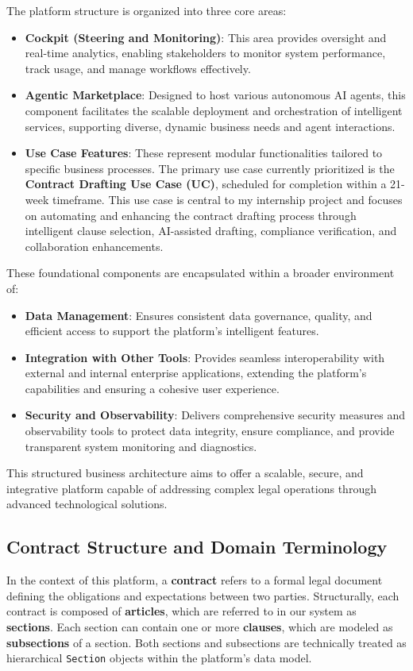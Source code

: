 The platform structure is organized into three core areas:

\begin{itemize}
\item \textbf{Cockpit (Steering and Monitoring)}: This area provides oversight and real-time analytics, enabling stakeholders to monitor system performance, track usage, and manage workflows effectively.
\item \textbf{Agentic Marketplace}: Designed to host various autonomous AI agents, this component facilitates the scalable deployment and orchestration of intelligent services, supporting diverse, dynamic business needs and agent interactions.
\item \textbf{Use Case Features}: These represent modular functionalities tailored to specific business processes. The primary use case currently prioritized is the \textbf{Contract Drafting Use Case (UC)}, scheduled for completion within a 21-week timeframe. This use case is central to my internship project and focuses on automating and enhancing the contract drafting process through intelligent clause selection, AI-assisted drafting, compliance verification, and collaboration enhancements.
\end{itemize}

These foundational components are encapsulated within a broader environment of:

\begin{itemize}
\item \textbf{Data Management}: Ensures consistent data governance, quality, and efficient access to support the platform's intelligent features.
\item \textbf{Integration with Other Tools}: Provides seamless interoperability with external and internal enterprise applications, extending the platform's capabilities and ensuring a cohesive user experience.
\item \textbf{Security and Observability}: Delivers comprehensive security measures and observability tools to protect data integrity, ensure compliance, and provide transparent system monitoring and diagnostics.
\end{itemize}

This structured business architecture aims to offer a scalable, secure, and integrative platform capable of addressing complex legal operations through advanced technological solutions.

\subsection{Contract Structure and Domain Terminology}
In the context of this platform, a \textbf{contract} refers to a formal legal document defining the obligations and expectations between two parties. Structurally, each contract is composed of \textbf{articles}, which are referred to in our system as \textbf{sections}. Each section can contain one or more \textbf{clauses}, which are modeled as \textbf{subsections} of a section. Both sections and subsections are technically treated as hierarchical \texttt{Section} objects within the platform’s data model.\mynewline

